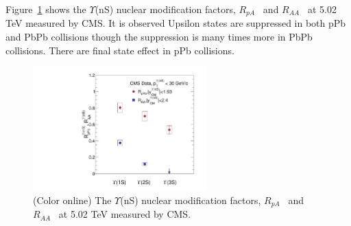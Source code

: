 Figure~\ref{fig:LHCpBPbPb} shows the $\Upsilon$(nS) nuclear modification factors,
    $R_{pA}$~\cite{CMS:2022wfi} and $R_{AA}$~\cite{CMS:2018zza}
 at 5.02 TeV measured by CMS.
 It is observed Upsilon states are suppressed in both pPb and PbPb collisions
 though the suppression is many times more in PbPb collisions. There are
 final state effect in pPb collisions. 
    

\begin{figure}
\centering
  \includegraphics[width=0.60\textwidth]{Figures/ExpOverview/Fig_LHC_YnSRPPbRAAInt.pdf}
  \caption{(Color online) The $\Upsilon$(nS) nuclear modification factors,
    $R_{pA}$~\cite{CMS:2022wfi} and $R_{AA}$~\cite{CMS:2018zza}
    at 5.02 TeV measured by CMS.
  }
 \label{fig:LHCpBPbPb}
\end{figure}



  

